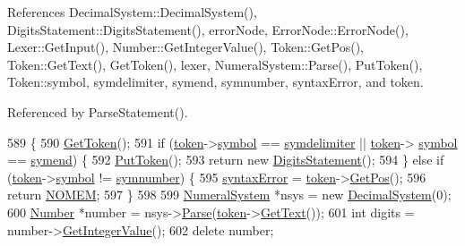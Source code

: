 References Decimal\+System\+::\+Decimal\+System(), Digits\+Statement\+::\+Digits\+Statement(), error\+Node, Error\+Node\+::\+Error\+Node(), Lexer\+::\+Get\+Input(), Number\+::\+Get\+Integer\+Value(), Token\+::\+Get\+Pos(), Token\+::\+Get\+Text(), Get\+Token(), lexer, Numeral\+System\+::\+Parse(), Put\+Token(), Token\+::symbol, symdelimiter, symend, symnumber, syntax\+Error, and token.



Referenced by Parse\+Statement().


\begin{DoxyCode}
589 \{
590     \hyperlink{classParser_a415a103e66558b4d366d9a1420561fe3}{GetToken}();
591     \textcolor{keywordflow}{if} (\hyperlink{classParser_a467028559d31c5b33f16ca8be56715cc}{token}->\hyperlink{structToken_aa671eaaae5632c5277e89a090d864820}{symbol} == \hyperlink{lex_8h_a7feef761cd73fac6e25b8bb80d2c4e54ac8e5e4f0940e69be4fca18ed8cbb236f}{symdelimiter} || \hyperlink{classParser_a467028559d31c5b33f16ca8be56715cc}{token}->
      \hyperlink{structToken_aa671eaaae5632c5277e89a090d864820}{symbol} == \hyperlink{lex_8h_a7feef761cd73fac6e25b8bb80d2c4e54a9be8426421896b360944c1313abeffdb}{symend}) \{
592         \hyperlink{classParser_adb5c3a188b36f7ecb198ae30f06338b3}{PutToken}();
593         \textcolor{keywordflow}{return} \textcolor{keyword}{new} \hyperlink{classDigitsStatement}{DigitsStatement}();
594     \} \textcolor{keywordflow}{else} \textcolor{keywordflow}{if} (\hyperlink{classParser_a467028559d31c5b33f16ca8be56715cc}{token}->\hyperlink{structToken_aa671eaaae5632c5277e89a090d864820}{symbol} != \hyperlink{lex_8h_a7feef761cd73fac6e25b8bb80d2c4e54add691c5ad44197e2c9e9dab9793450a2}{symnumber}) \{
595         \hyperlink{classParser_ae50a199b804c9f5e8342a4d0a1ae6a95}{syntaxError} = \hyperlink{classParser_a467028559d31c5b33f16ca8be56715cc}{token}->\hyperlink{structToken_a5f93ea94940a6eeb060507e1da594599}{GetPos}();
596         \textcolor{keywordflow}{return} \hyperlink{platform_8h_a46ff2bfbf0d44b8466a2251d5bd5e6f8}{NOMEM};
597     \}
598 
599     \hyperlink{classNumeralSystem}{NumeralSystem} *nsys = \textcolor{keyword}{new} \hyperlink{classDecimalSystem}{DecimalSystem}(0);
600     \hyperlink{structNumber}{Number} *number = nsys->\hyperlink{classNumeralSystem_af3643941efdda71a873e2a31276f2d49}{Parse}(\hyperlink{classParser_a467028559d31c5b33f16ca8be56715cc}{token}->\hyperlink{structToken_a15f1043de07ce8e452fbf115b85def71}{GetText}());
601     \textcolor{keywordtype}{int} digits = number->\hyperlink{structNumber_aa2c4b207ac557a8bdbc1cf5696d37160}{GetIntegerValue}();
602     \textcolor{keyword}{delete} number;

\end{DoxyCode}
